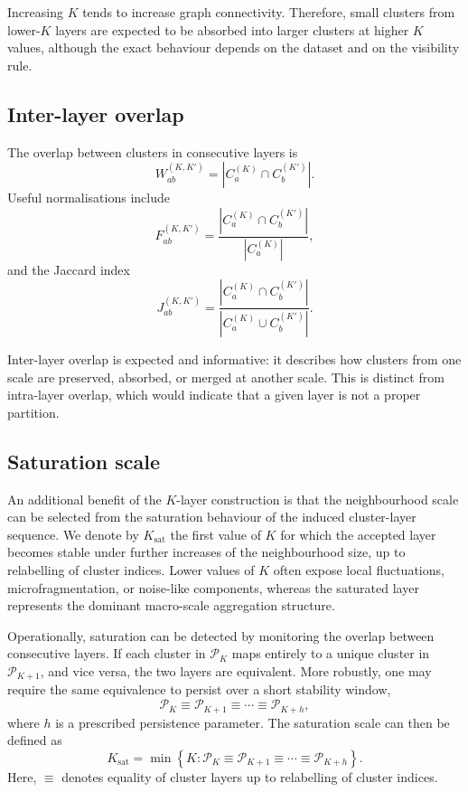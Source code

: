 \documentclass[pdflatex,sn-mathphys-num]{sn-jnl}
\newcommand{\calP}{\mathcal{P}}
\begin{document}
Increasing $K$ tends to increase graph connectivity. Therefore, small clusters from lower-$K$ layers are expected to be absorbed into larger clusters at higher $K$ values, although the exact behaviour depends on the dataset and on the visibility rule.

\subsection{Inter-layer overlap}

The overlap between clusters in consecutive layers is
\begin{equation}
W_{ab}^{(K,K')}=|C_a^{(K)}\cap C_b^{(K')}|.
\label{eq:overlap_count}
\end{equation}
Useful normalisations include
\begin{equation}
F_{ab}^{(K,K')}=\frac{|C_a^{(K)}\cap C_b^{(K')}|}{|C_a^{(K)}|},
\label{eq:frac_from}
\end{equation}
and the Jaccard index
\begin{equation}
J_{ab}^{(K,K')}=\frac{|C_a^{(K)}\cap C_b^{(K')}|}{|C_a^{(K)}\cup C_b^{(K')}|}.
\label{eq:jaccard}
\end{equation}

Inter-layer overlap is expected and informative: it describes how clusters from one scale are preserved, absorbed, or merged at another scale. This is distinct from intra-layer overlap, which would indicate that a given layer is not a proper partition.

\subsection{Saturation scale}

An additional benefit of the $K$-layer construction is that the neighbourhood scale can be selected from the saturation behaviour of the induced cluster-layer sequence. We denote by $K_{\mathrm{sat}}$ the first value of $K$ for which the accepted layer becomes stable under further increases of the neighbourhood size, up to relabelling of cluster indices. Lower values of $K$ often expose local fluctuations, microfragmentation, or noise-like components, whereas the saturated layer represents the dominant macro-scale aggregation structure.

Operationally, saturation can be detected by monitoring the overlap between consecutive layers. If each cluster in $\calP_K$ maps entirely to a unique cluster in $\calP_{K+1}$, and vice versa, the two layers are equivalent. More robustly, one may require the same equivalence to persist over a short stability window,
\begin{equation}
\calP_K \equiv \calP_{K+1}\equiv\cdots\equiv\calP_{K+h},
\label{eq:partition_stability_window}
\end{equation}
where $h$ is a prescribed persistence parameter. The saturation scale can then be defined as
\begin{equation}
K_{\mathrm{sat}}=
\min\left\{
K:\calP_K \equiv \calP_{K+1}\equiv\cdots\equiv\calP_{K+h}
\right\}.
\label{eq:ksat}
\end{equation}
Here, $\equiv$ denotes equality of cluster layers up to relabelling of cluster indices.
\end{document}
